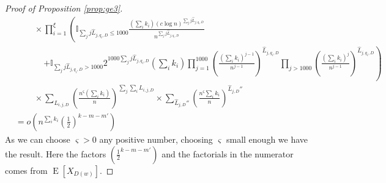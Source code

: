 \documentclass[12pt]{article}
\numberwithin{equation}{section}
\numberwithin{equation}{section}
\theoremstyle{definition}
\DeclareMathOperator{\E}{E} \DeclareMathOperator{\var}{Var}
\renewcommand{\1}{\bf 1}
\begin{document}
\begin{proof}[Proof of Proposition \ref{prop:ge3}]
\begin{equation}
\begin{split}
&~~~~~~~~~~ \times \prod_{i=1}^{\xi}\left( \mathbb{I}_{\sum_{j}j\hat{L}_{j,q_{i},D}\le 1000} \frac{\left(\sum_{i}k_{i}\right)\left(c\log n\right)^{\sum_{j}j\hat{L}_{j,q_{i},D}}}{n^{\sum_{j}j\hat{L}_{j,q_{i},D}}} \right.\\
&~~~~~~~~~~~~~~~\left. + \mathbb{I}_{\sum_{j}j\hat{L}_{j,q_{i},D}> 1000} 2^{1000 \sum_{j}j\hat{L}_{j,q_{i},D}}\left( \sum_{i} k_{i} \right)\prod_{j=1}^{1000}\left(\frac{(\sum_{i}k_{i})^{j-1}}{n^{j-1}}\right)^{\hat{L}_{j,q_{i},D}}\prod_{j>1000}\left( \frac{\left( \sum_{i} k_{i} \right)^{j}}{n^{j-1}} \right)^{\hat{L}_{j,q_{i},D}}\right)\\
&~~~~~~~~~~\times \sum_{L_{i,j,D}}\left(\frac{n^{\varsigma} \left( \sum_{i} k_{i} \right)}{n}\right)^{\sum_{j}\sum_{i} L_{i,j,D}} \times \sum_{\hat{L}_{j,D}''}\left( \frac{n^{\varsigma}\sum_{i}k_{i}}{n} \right)^{\hat{L}_{j,D}''}\\
&= o\left(n^{\sum_{i}k_{i}}\left(\frac{1}{2}\right)^{k-m-m'}\right)
\end{split}
\end{equation} 
As we can choose $\varsigma>0$ any positive number, choosing $\varsigma$ small enough we have the result.
Here the factors $\left( \frac{1}{2}^{k-m-m'} \right)$ and the factorials in the numerator comes from $\E[X_{D(w)}].$ %
\end{proof}
 
\end{document}

